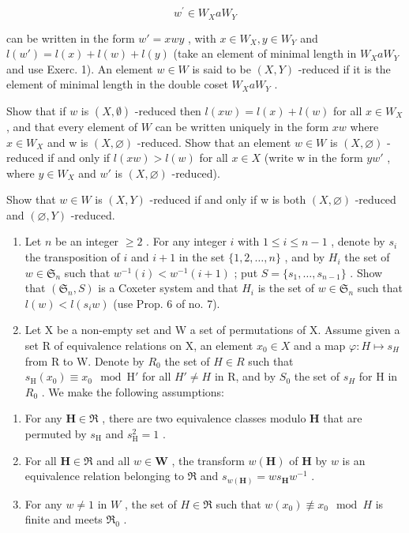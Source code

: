 \[
w ^ {\prime} \in W _ {X} a W _ {Y}
\]

can be written in the form \(w' = xwy\) , with \(x \in W_X, y \in W_Y\) and \(l(w') = l(x) + l(w) + l(y)\) (take an element of minimal length in \(W_X aW_Y\) and use Exerc. 1). An element \(w \in W\) is said to be \((X,Y)\) -reduced if it is the element of minimal length in the double coset \(W_X aW_Y\) .

Show that if \(w\) is \((X, \emptyset)\) -reduced then \(l(xw) = l(x) + l(w)\) for all \(x \in W_X\) , and that every element of \(W\) can be written uniquely in the form \(xw\) where \(x \in W_{X}\) and w is \((X, \varnothing)\) -reduced. Show that an element \(w \in W\) is \((X, \varnothing)\) -reduced if and only if \(l(xw) > l(w)\) for all \(x \in X\) (write w in the form \(yw'\) , where \(y \in W_{X}\) and \(w'\) is \((X, \varnothing)\) -reduced).

Show that \(w \in W\) is \((X, Y)\) -reduced if and only if w is both \((X, \varnothing)\) -reduced and \((\varnothing, Y)\) -reduced.

\begin{enumerate}
\def\labelenumi{\arabic{enumi})}
\setcounter{enumi}{3}
\item
  Let \(n\) be an integer \(\geqslant 2\) . For any integer \(i\) with \(1 \leqslant i \leqslant n - 1\) , denote by \(s_i\) the transposition of \(i\) and \(i + 1\) in the set \(\{1, 2, \ldots, n\}\) , and by \(H_i\) the set of \(w \in \mathfrak{S}_n\) such that \(w^{-1}(i) < w^{-1}(i + 1)\) ; put \(S = \{s_1, \ldots, s_{n-1}\}\) . Show that \((\mathfrak{S}_n, S)\) is a Coxeter system and that \(H_i\) is the set of \(w \in \mathfrak{S}_n\) such that \(l(w) < l(s_i w)\) (use Prop. 6 of no. 7).
\item
  Let X be a non-empty set and W a set of permutations of X. Assume given a set R of equivalence relations on X, an element \(x_{0} \in X\) and a map \(\varphi : H \mapsto s_{H}\) from R to W. Denote by \(R_{0}\) the set of \(H \in R\) such that \(s_{\mathrm{H}}(x_{0}) \equiv x_{0} \mod \mathrm{H}'\) for all \(H' \neq H\) in R, and by \(S_{0}\) the set of \(s_{H}\) for H in \(R_{0}\) . We make the following assumptions:
\end{enumerate}

\begin{enumerate}
\def\labelenumi{(\roman{enumi})}
\item
  For any \(\mathbf{H} \in \Re\) , there are two equivalence classes modulo \(\mathbf{H}\) that are permuted by \(s_{\mathrm{H}}\) and \(s_{\mathrm{H}}^{2} = 1\) .
\item
  For all \(\mathbf{H} \in \Re\) and all \(w \in \mathbf{W}\) , the transform \(w(\mathbf{H})\) of \(\mathbf{H}\) by \(w\) is an equivalence relation belonging to \(\Re\) and \(s_{w(\mathbf{H})} = ws_{\mathbf{H}}w^{-1}\) .
\item
  For any \(w \neq 1\) in \(W\) , the set of \(H \in \Re\) such that \(w(x_0) \not\equiv x_0 \mod H\) is finite and meets \(\Re_0\) .
\end{enumerate}


